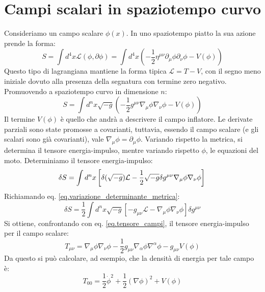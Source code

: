 \section{Campi scalari in spaziotempo curvo}
Consideriamo un campo scalare $\phi(x)$. In uno spaziotempo piatto la sua azione prende la forma:
\begin{equation*}
    S = \int d^4x \mathcal{L}(\phi, \partial \phi) = \int d^4x \left( -\frac{1}{2}\eta^{\mu\nu} \partial_\mu \phi \partial_\nu \phi - V(\phi) \right)
\end{equation*}
Questo tipo di lagrangiana mantiene la forma tipica $\mathcal{L} = T - V$, con il segno meno iniziale dovuto alla presenza della segnatura con termine zero negativo.
Promuovendo a spaziotempo curvo in dimensione $n$:
\begin{equation*}
    S = \int d^n x \sqrt{- g}\left( - \frac{1}{2}g^{\mu\nu} \nabla_\mu \phi \nabla_\nu \phi - V(\phi) \right)
\end{equation*}
Il termine $V(\phi)$ è quello che andrà a descrivere il campo inflatore.
Le derivate parziali sono state promosse a covarianti, tuttavia, essendo il campo scalare (e gli scalari sono già covarianti), vale $\nabla_\mu \phi = \partial_\mu \phi$.
Variando rispetto la metrica, si determina il tensore energia-impulso, mentre variando rispetto $\phi$, le equazioni del moto. Determiniamo il tensore energia-impulso:
\begin{equation*}
    \delta S = \int d^n x \left[ \delta(\sqrt{-g})\mathcal{L} - \frac{1}{2}\sqrt{-g}\delta g^{\mu\nu} \nabla_\mu\phi\nabla_\nu\phi \right] \\
\end{equation*}
Richiamando eq. \ref{eq.variazione_determinante_metrica}:
\begin{equation*}
    \delta S = \frac{1}{2}\int d^n x \sqrt{-g} \left[ - g_{\mu\nu}\mathcal{L} - \nabla_\mu\phi \nabla_\nu\phi \right]\delta g^{\mu\nu}
\end{equation*}
Si ottiene, confrontando con eq. \ref{eq.tensore_campi}, il tensore energia-impulso per il campo scalare:
\begin{equation*}
    T_{\mu\nu} = \nabla_\mu\phi \nabla_\nu\phi - \frac{1}{2}g_{\mu\nu}\nabla_\alpha \phi \nabla^\alpha\phi - g_{\mu\nu}V(\phi)
\end{equation*}
Da questo si può calcolare, ad esempio, che la densità di energia per tale campo è:
\begin{equation*}
    T_{00} = \frac{1}{2}\dot{\phi}^2 + \frac{1}{2}(\nabla\phi)^2 + V(\phi)
\end{equation*}

